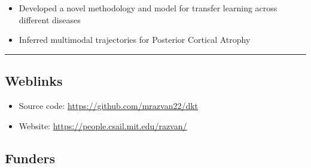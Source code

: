 \documentclass[portrait,a0,final,20pt]{a0poster}
\begin{document}
{\begin{multicols}{2}

\begin{itemize}
 \item Developed a novel methodology and model for transfer learning across different diseases
 \item Inferred multimodal trajectories for Posterior Cortical Atrophy
\end{itemize}





\end{multicols}
\hrule


}


\begin{multicols}{2}

\Large{

\raggedcolumns	


\vspace{-1em}
\subsection*{Weblinks}
\begin{itemize}
\item Source code: \url{https://github.com/mrazvan22/dkt}
\item Website: \url{https://people.csail.mit.edu/razvan/}
\end{itemize}
}



\columnbreak

\subsection*{Funders}


\end{multicols}
\end{document}
